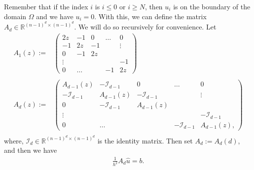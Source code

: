 Remember that if the index \(i\) is \(i \leq 0\) or \(i \geq N\), then \(u_i\) is on the boundary of the domain \(\Omega\) and we have \(u_i = 0\). With this, we can define the matrix \(A_d \in \mathbb{R}^{(n-1)^d \times (n-1)^d}\). We will do so recursively for convenience. Let
\begin{align*}
	A_1 (z) :=&
	\begin{pmatrix}
		2z & -1 & 0 & \dots & 0 \\
		-1 & 2z & -1 & & \vdots  \\
		0 & -1 & 2z & & \\
		\vdots & & &    & -1\\
		0 & \dots & &  -1 & 2z
	\end{pmatrix} \\
	\\
	A_d (z) :=&
	\begin{pmatrix}
		A_{d-1}(z) & -\mathcal{I}_{d-1} & 0 & \dots & 0 \\
		-\mathcal{I}_{d-1} & A_{d-1}(z) & -\mathcal{I}_{d-1} & & \vdots  \\
		0 & -\mathcal{I}_{d-1} & A_{d-1}(z) & & \\
		\vdots & & &    & -\mathcal{I}_{d-1}\\
		0 & \dots & &  -\mathcal{I}_{d-1} & A_{d-1}(z) \text{,}
	\end{pmatrix} \\
\end{align*}
where, \(\mathcal{I}_d \in \mathbb{R}^{(n-1)^d \times (n-1)^d}\) is the identity matrix. Then set \(A_d := A_d(d)\), and then we have
\begin{align*}
	\frac{1}{h^2} A_d \hat{u} = b \text{.}
\end{align*}